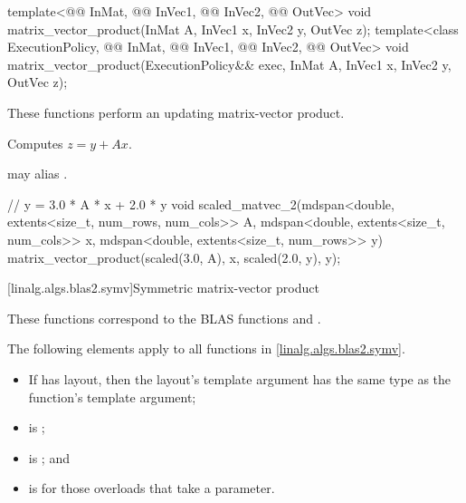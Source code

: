 %
\begin{itemdecl}
  template<@@ InMat, @@ InVec1, @@ InVec2, @@ OutVec>
    void matrix_vector_product(InMat A, InVec1 x, InVec2 y, OutVec z);
  template<class ExecutionPolicy,
           @@ InMat, @@ InVec1, @@ InVec2, @@ OutVec>
    void matrix_vector_product(ExecutionPolicy&& exec,
                               InMat A, InVec1 x, InVec2 y, OutVec z);
\end{itemdecl}

\begin{itemdescr}
\pnum
These functions perform an updating matrix-vector product.

\pnum
\effects
Computes $z = y + A x$.

\pnum
\remarks
{} may alias .
\end{itemdescr}

\begin{example}
\begin{codeblock}
// y = 3.0 * A * x + 2.0 * y
void scaled_matvec_2(mdspan<double, extents<size_t, num_rows, num_cols>> A,
  mdspan<double, extents<size_t, num_cols>> x, mdspan<double, extents<size_t, num_rows>> y) {
  matrix_vector_product(scaled(3.0, A), x, scaled(2.0, y), y);
}
\end{codeblock}
\end{example}

[linalg.algs.blas2.symv]{Symmetric matrix-vector product}

\pnum
\begin{note}
These functions correspond to the BLAS functions
 and \supercite{blas2}.
\end{note}

\pnum
The following elements apply to all functions in \ref{linalg.algs.blas2.symv}.

\pnum
\mandates
\begin{itemize}
\item
If  has  layout,
then the layout's  template argument has
the same type as the function's  template argument;
\item
{} is ;
\item
{}
is ; and
\item
{}
is  for those overloads that take a  parameter.
\end{itemize}

